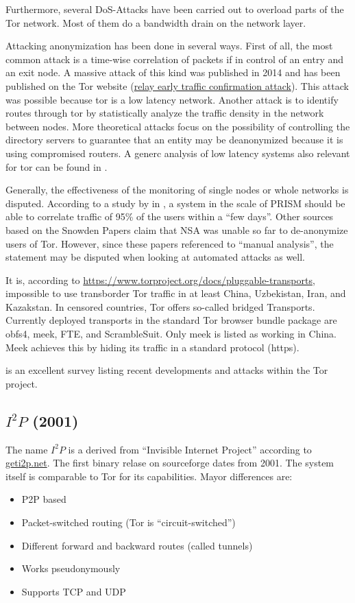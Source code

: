 Furthermore, several DoS-Attacks have been carried out to overload parts of the Tor network. Most of them do a bandwidth drain on the network layer.

Attacking anonymization has been done in several ways. First of all, the most common attack is a time-wise correlation of packets if in control of an entry and an exit node. A massive attack of this kind was published in 2014 and has been published on the Tor website (\href{https://blog.torproject.org/blog/tor-security-advisory-relay-early-traffic-confirmation-attack}{relay early traffic confirmation attack}). This attack was possible because tor is a low latency network. Another attack is to identify routes through tor by statistically analyze the traffic density in the network between nodes. More theoretical attacks focus on the possibility of controlling the directory servers to guarantee that an entity may be deanonymized because it is using compromised routers. A generc analysis of low latency systems also relevant for tor can be found in \cite{johnson2009design}.

Generally, the effectiveness of the monitoring of single nodes or whole networks is disputed. According to a study by \citeauthor{ccs2013-usersrouted} in \citeyear{ccs2013-usersrouted}\cite{ccs2013-usersrouted}, a system in the scale of PRISM should be able to correlate traffic of 95\% of the users within a ``few days''. Other sources based on the Snowden Papers claim that NSA was unable so far to de-anonymize users of  Tor. However, since these papers referenced to ``manual analysis'', the statement may be disputed when looking at automated attacks as well.

It is, according to \url{https://www.torproject.org/docs/pluggable-transports}, impossible to use transborder Tor traffic in at least China, Uzbekistan, Iran, and Kazakstan. In censored countries, Tor offers so-called bridged Transports. Currently deployed transports in the standard Tor browser bundle package are obfs4, meek, FTE, and ScrambleSuit. Only meek is listed as working in China. Meek achieves this by hiding its traffic in a standard protocol (https).

\cite{saleh2018shedding} is an excellent survey listing recent developments and attacks within the Tor project.

\subsection{\texorpdfstring{$I^2P$}{I2P} (2001)}
The name $I^2P$ is a derived from  ``Invisible Internet Project'' according to \href{https://geti2p.net/}{geti2p.net}. The first binary relase on sourceforge dates from 2001. The system itself is comparable to Tor for its capabilities. Mayor differences are:
\begin{itemize}
	\item P2P based
	\item Packet-switched routing (Tor is ``circuit-switched'')
	\item Different forward and backward routes (called tunnels)
	\item Works pseudonymously
	\item Supports TCP and UDP
\end{itemize}

